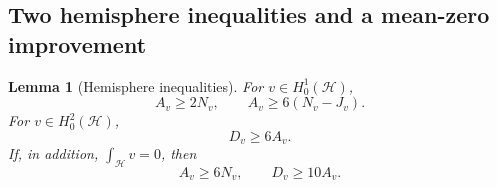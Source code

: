 \documentclass[11pt,a4paper]{article}
\newtheorem{lemma}[theorem]{Lemma}
\theoremstyle{remark}
\numberwithin{equation}{section}
\begin{document}
\subsection{Two hemisphere inequalities and a mean-zero improvement}

\begin{lemma}[Hemisphere inequalities]\label{lem:hemisphere-basic20}
For $v\in H_0^1(\mathcal H)$,
\begin{equation}\label{eq:hemisphere-poincare20}
 A_v\ge2N_v,\qquad A_v\ge6(N_v-J_v).
\end{equation}
For $v\in H_0^2(\mathcal H)$,
\begin{equation}\label{eq:hemisphere-buckling20}
 D_v\ge6A_v.
\end{equation}
If, in addition, $\int_{\mathcal H}v=0$, then
\begin{equation}\label{eq:hemisphere-zero-mean20}
 A_v\ge6N_v,\qquad D_v\ge10A_v.
\end{equation}
\end{lemma}
\end{document}
